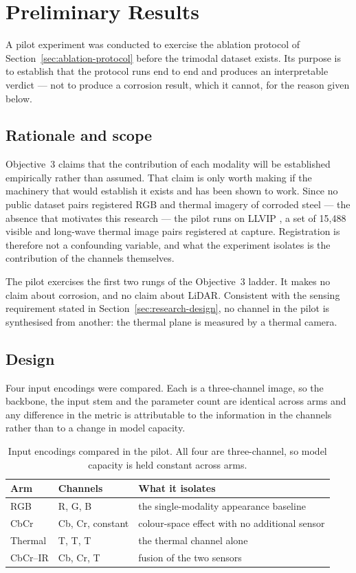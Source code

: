 \section{Preliminary Results}
\label{sec:preliminary-results}

A pilot experiment was conducted to exercise the ablation protocol of
Section~\ref{sec:ablation-protocol} before the trimodal dataset exists. Its
purpose is to establish that the protocol runs end to end and produces an
interpretable verdict --- not to produce a corrosion result, which it cannot,
for the reason given below.

\subsection{Rationale and scope}

Objective~3 claims that the contribution of each modality will be established
empirically rather than assumed. That claim is only worth making if the
machinery that would establish it exists and has been shown to work. Since no
public dataset pairs registered RGB and thermal imagery of corroded steel ---
the absence that motivates this research --- the pilot runs on LLVIP
\citep{Jia2021}, a set of 15{,}488 visible and long-wave thermal image pairs
registered at capture. Registration is therefore not a confounding variable, and
what the experiment isolates is the contribution of the channels themselves.

The pilot exercises the first two rungs of the Objective~3 ladder. It makes no
claim about corrosion, and no claim about LiDAR. Consistent with the sensing
requirement stated in Section~\ref{sec:research-design}, no channel in the pilot
is synthesised from another: the thermal plane is measured by a thermal camera.

\subsection{Design}

Four input encodings were compared. Each is a three-channel image, so the
backbone, the input stem and the parameter count are identical across arms and
any difference in the metric is attributable to the information in the channels
rather than to a change in model capacity.

\begin{table}[htbp]
\centering
\caption{Input encodings compared in the pilot. All four are three-channel, so
model capacity is held constant across arms.}
\label{tab:prelim-arms}
\begin{tabularx}{\textwidth}{@{}l l X@{}}
\toprule
\textbf{Arm} & \textbf{Channels} & \textbf{What it isolates} \\
\midrule
RGB & R, G, B & the single-modality appearance baseline \\
CbCr & Cb, Cr, constant & colour-space effect with no additional sensor \\
Thermal & T, T, T & the thermal channel alone \\
CbCr--IR & Cb, Cr, T & fusion of the two sensors \\
\bottomrule
\end{tabularx}
\end{table}

